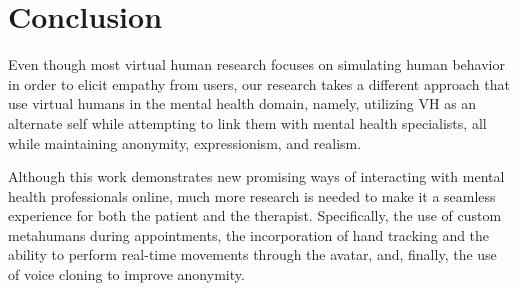 \section{Conclusion}
Even though most virtual human research focuses on simulating human behavior in order to elicit empathy from users, our research takes a different approach that use virtual humans in the mental health domain, namely, utilizing VH as an alternate self while attempting to link them with mental health specialists, all while maintaining anonymity, expressionism, and realism.

Although this work demonstrates new promising ways of interacting with mental health professionals online, much more research is needed to make it a seamless experience for both the patient and the therapist. Specifically, the use of custom metahumans during appointments, the incorporation of hand tracking and the ability to perform real-time movements through the avatar, and, finally, the use of voice cloning to improve anonymity.